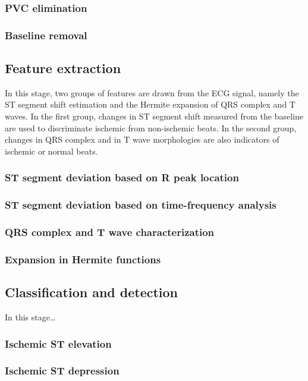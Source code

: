     \subsubsection{PVC elimination}
    \subsubsection{Baseline removal}
    
\subsection{Feature extraction}
    In this stage, two groups of features are drawn from the ECG signal, namely the ST segment shift estimation and the Hermite expansion of QRS complex and T waves. In the first group, changes in ST segment shift measured from the baseline are used to discriminate ischemic from non-ischemic beats. In the second group, changes in QRS complex and in T wave morphologies are also indicators of ischemic or normal beats.
    
    \subsubsection{ST segment deviation based on R peak location}
    \subsubsection{ST segment deviation based on time-frequency analysis}
    \subsubsection{QRS complex and T wave characterization}
    \subsubsection{Expansion in Hermite functions}
    
\subsection{Classification and detection}
    In this stage\ldots
    
    \subsubsection{Ischemic ST elevation}
    \subsubsection{Ischemic ST depression}
